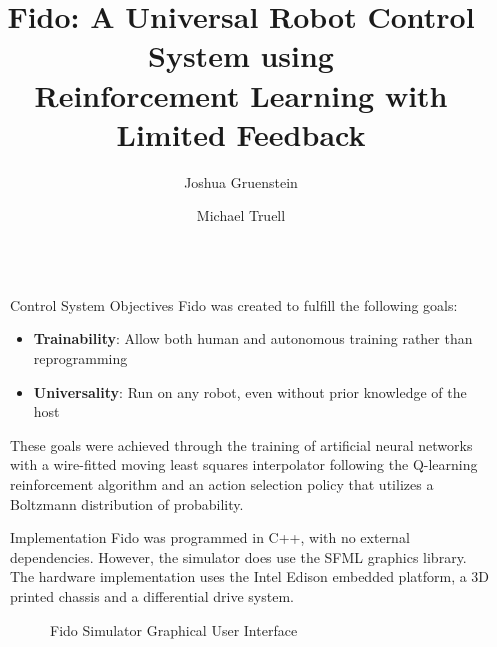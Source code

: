 \documentclass[final]{beamer}
\title{Fido: A Universal Robot Control System using\\Reinforcement Learning with Limited Feedback}
\author{Joshua Gruenstein \and Michael Truell}
\institute{Horace Mann School}
\newlength{\sepwid}
\newlength{\onecolwid}
\begin{document}
\setlength{\belowcaptionskip}{2ex}
\setlength\belowdisplayshortskip{2ex}

\begin{frame}[t]
\begin{columns}[t]

\begin{column}{\sepwid}\end{column}
\begin{column}{\onecolwid}

	\begin{alertblock}{Control System Objectives}
		Fido was created to fulfill the following goals:
		\begin{itemize}
			\item \textbf{Trainability}: Allow both human and autonomous training rather than reprogramming
			\item \textbf{Universality}: Run on any robot, even without prior knowledge of the host
		\end{itemize}
		These goals were achieved through the training of artificial neural networks with a wire-fitted moving least squares interpolator following the Q-learning reinforcement algorithm and an action selection policy that utilizes a Boltzmann distribution of probability.
	\end{alertblock}

	\begin{block}{Implementation}
		Fido was programmed in C++, with no external dependencies.  However, the simulator does use the SFML graphics library.  The hardware implementation uses the Intel Edison embedded platform, a 3D printed chassis and a differential drive system.

		\begin{figure}
			\centering
			\caption{Fido Simulator Graphical User Interface}
		\end{figure}


\end{block}
\end{column}
\end{columns}
\end{frame}
\end{document}
